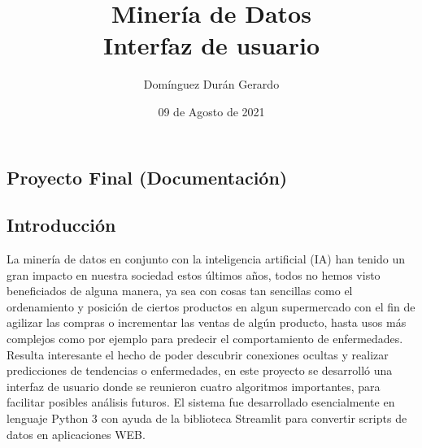 \documentclass[10pt,a4paper]{article}
\title{Minería de Datos \\ Interfaz de usuario}
\author{Domínguez Durán Gerardo}
\date{09 de Agosto de 2021}
\begin{document}
\maketitle
\begin{center}
\section*{Proyecto Final (Documentación)}
\end{center}



\subsection*{Introducción}
La minería de datos en conjunto con la inteligencia artificial (IA) han tenido un gran impacto en nuestra sociedad estos últimos años, todos no hemos visto beneficiados de alguna manera, ya sea con cosas tan sencillas como el ordenamiento y posición de ciertos productos en algun supermercado con el fin de agilizar las compras o incrementar las ventas de algún producto, hasta usos más complejos como por ejemplo para predecir el comportamiento de enfermedades. Resulta interesante el hecho de poder descubrir conexiones ocultas y realizar predicciones de tendencias o enfermedades, en este proyecto se desarrolló una interfaz de usuario donde se reunieron cuatro algoritmos importantes, para facilitar posibles análisis futuros. El sistema fue desarrollado esencialmente en lenguaje Python 3 con ayuda de la biblioteca Streamlit para convertir scripts de datos en aplicaciones WEB.
\end{document}
